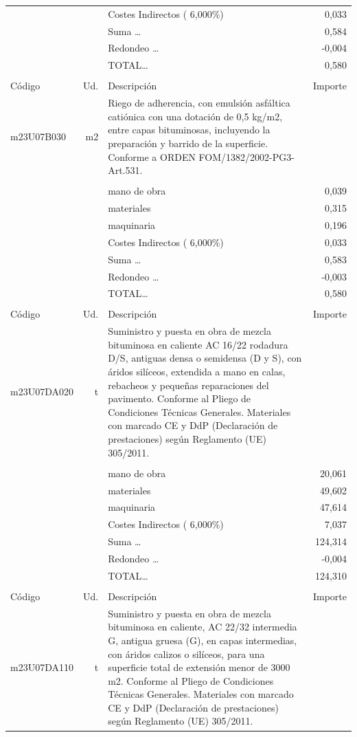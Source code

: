 \begin{supertabular}{l r p{60mm} r}
&&Costes Indirectos (     6,000\%)&     0,033\\%
&&Suma \ldots&     0,584\\%
&&Redondeo \ldots&    {-}0,004\\%
%
&&TOTAL\ldots&     0,580\\%
&&&\\%
Código&Ud.&Descripción&Importe\\%
\hline%
m23U07B030&m2&Riego de adherencia, con emulsión asfáltica catiónica con una dotación de 0,5 kg/m2, entre capas bituminosas, incluyendo la preparación y barrido de la superficie. Conforme a ORDEN FOM/1382/2002{-}PG3{-}Art.531.&\\%
&&&\\%
&&mano de obra&     0,039\\%
&&materiales&     0,315\\%
&&maquinaria&     0,196\\%
&&Costes Indirectos (     6,000\%)&     0,033\\%
&&Suma \ldots&     0,583\\%
&&Redondeo \ldots&    {-}0,003\\%
%
&&TOTAL\ldots&     0,580\\%
&&&\\%
Código&Ud.&Descripción&Importe\\%
\hline%
m23U07DA020&t&Suministro y puesta en obra de mezcla bituminosa en caliente AC 16/22 rodadura D/S, antiguas densa o semidensa (D y S), con áridos silíceos, extendida a mano en calas, rebacheos y pequeñas reparaciones del pavimento. Conforme al Pliego de Condiciones Técnicas Generales. Materiales con marcado CE y DdP (Declaración de prestaciones) según Reglamento (UE) 305/2011.&\\%
&&&\\%
&&mano de obra&    20,061\\%
&&materiales&    49,602\\%
&&maquinaria&    47,614\\%
&&Costes Indirectos (     6,000\%)&     7,037\\%
&&Suma \ldots&   124,314\\%
&&Redondeo \ldots&    {-}0,004\\%
%
&&TOTAL\ldots&   124,310\\%
&&&\\%
Código&Ud.&Descripción&Importe\\%
\hline%
m23U07DA110&t&Suministro y puesta en obra de mezcla bituminosa en caliente, AC 22/32 intermedia G, antigua gruesa (G), en capas intermedias, con áridos calizos o silíceos, para una superficie total de extensión menor de 3000 m2. Conforme al Pliego de Condiciones Técnicas Generales. Materiales con marcado CE y DdP (Declaración de prestaciones) según Reglamento (UE) 305/2011.&\\%

\end{supertabular}
